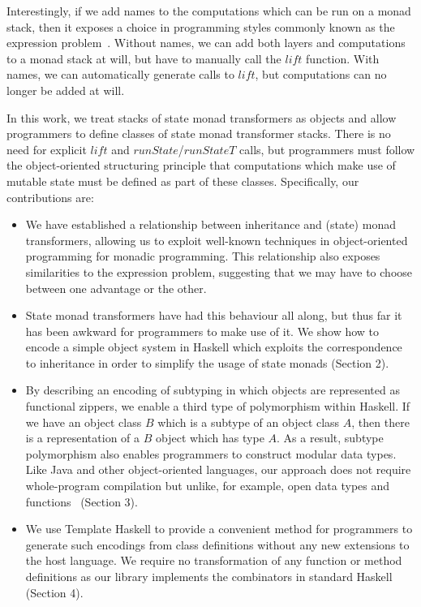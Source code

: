 Interestingly, if we add names to the computations which can be run on a monad stack, then it exposes a choice in programming styles commonly known as the expression problem~\cite{wadler1998expression}. Without names, we can add both layers and computations to a monad stack at will, but have to manually call the $\mathit{lift}$ function. With names, we can automatically generate calls to $\mathit{lift}$, but computations can no longer be added at will.

In this work, we treat stacks of state monad transformers as objects and allow programmers to define classes of state monad transformer stacks.
There is no need for explicit $\mathit{lift}$ and $\mathit{runState}$/$\mathit{runStateT}$ calls, but programmers
must follow the object-oriented structuring principle that
computations which make use of mutable state must be defined
as part of these classes.
Specifically, our contributions are:
\begin{itemize}
    \item We have established a relationship between inheritance and (state) monad transformers, allowing us to exploit well-known techniques in object-oriented programming for monadic programming. This relationship also exposes similarities to the expression problem, suggesting that we may have to choose between one advantage or the other.
    \item State monad transformers have had this behaviour all along, but thus far it has been awkward for programmers to make use of it. We show how to encode a simple object system in Haskell which exploits the correspondence to inheritance in order to simplify the usage of state monads (Section 2).
    \item By describing an encoding of subtyping in which objects are represented as functional zippers, we enable a third type of polymorphism within Haskell. If we have an object class $B$ which is a subtype of an object class $A$, then there is a representation of a $B$ object which has type $A$. As a result, subtype polymorphism also enables programmers to construct modular data types. Like Java and other object-oriented languages, our approach does not require whole-program compilation but unlike, for example, open data types and functions~\cite{loh2006open} (Section 3).
    \item We use Template Haskell to provide a convenient method for programmers to generate such encodings from class definitions without any new extensions to the host language. We require no transformation of any function or method definitions as our library implements the combinators in standard Haskell (Section 4).
\end{itemize}

\pagebreak
